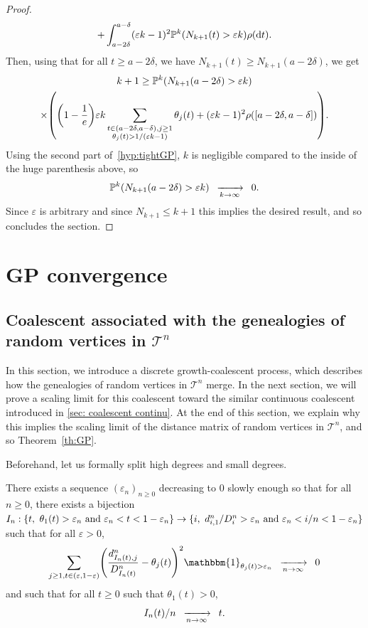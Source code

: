 \documentclass[AHL,Unicode,published]{cedram}
\newcommand{\probak}[1]{\mathbb{P}^k\left(#1\right)}
\newcommand{\e}{\varepsilon}
\newcommand{\cv}[1][n]{\enskip\xrightarrow[#1 \to \infty]{}\enskip}
\newcommand{\rmd}{\mathrm{d}}
\newcommand{\1}{\mathbbm{1}}
\newcommand{\T}{\mathcal{T}}
\let\originalleft\left
\let\originalright\right
\renewcommand{\left}{\mathopen{}\mathclose\bgroup\originalleft}
\renewcommand{\right}{\aftergroup\egroup\originalright}
\renewcommand*{\to}{\mathchoice{\longrightarrow}{\rightarrow}{\rightarrow}{\rightarrow}}
\begin{document}
\begin{proof}
\begin{multline*}
+\int_{a-2\delta}^{a-\delta}(\e k-1)^2 \probak{N_{k+1}(t)>\e k}\rho(\rmd t).
\end{multline*}
Then, using that for all $t\geq a-2\delta$, we have $N_{k+1}(t)\geq N_{k+1}(a-2\delta)$, we get
\begin{multline*}
k+1 \geq \probak{N_{k+1}(a-2\delta)>\e k}\\
\times\left (\left(1-\frac{1}{e}\right){\e k} \sum_{\substack{ t\in (a-2\delta,a-\delta), j\geq 1 \\\theta_j(t)>1/(\e k-1) }} \theta_j(t)
+(\e k-1)^2\rho([a-2\delta,a-\delta]) \right).
\end{multline*}
Using the second part of~\ref{hyp:tightGP}, $k$ is negligible compared to the inside of the huge parenthesis above, so
\[
\probak{N_{k+1}(a-2\delta)>\e k}\cv[k] 0.
\]
Since $\e$ is arbitrary and since $N_{k+1}\leq k+1$ this implies the desired result, and so concludes the section.
\end{proof}



\section{GP convergence} \label{sec:proofGP}


\subsection{Coalescent associated with the genealogies of random vertices in \texorpdfstring{$\T^n$}{T\^n}}\label{sous-section coalescent discret}
In this section, we introduce a discrete growth-coalescent process, which describes how the genealogies of random vertices in $\T^n$ merge. In the next section, we will prove a scaling limit for this coalescent toward the similar continuous coalescent introduced in \cref{sec: coalescent continu}. At the end of this section, we explain why this implies the scaling limit of the distance matrix of random vertices in $\T^n$, and so Theorem~\ref{th:GP}.


Beforehand, let us formally split high degrees and small degrees.

\begin{lemm}\label{lemme epsilon n}
There exists a sequence $(\e_n)_{n\ge0}$ decreasing to $0$ slowly enough so that for all $n\ge 0$, there exists a bijection~$I_n : \{ t,\ \theta_1(t)>\e_n \text{ and } \e_n <t <1-\e_n \} \to
\{ i, \ d^n_{i,1}/D^n_i>\e_n \text{ and }
\e_n < i/n < 1-\e_n\}$ such that for all $\e>0$,
\begin{equation}\label{eq:cv atomes L2}
\sum_{j \ge 1, t\in (\e, 1-\e)}
\left(
\frac{d^n_{I_n(t), j}}{D^n_{I_n(t)}} - \theta_j(t)
\right)^2
\1_{\theta_j(t)>\e_n }
\cv[n] 0
\end{equation}
and such that for all $t\ge0$ such that $\theta_1(t)>0$,
\begin{equation}\label{eq: cv I sur n vers t}
I_n(t)/n \cv[n] t.
\end{equation}
\end{lemm}
\end{document}
